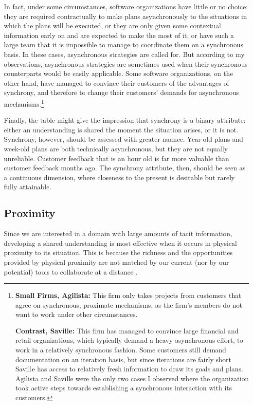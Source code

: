 In fact, under some circumstances, software organizations have little or no choice: they are required contractually to make plans asynchronously to the situations in which the plans will be executed, or they are only given some contextual information early on and are expected to make the most of it, or have such a large team that it is impossible to manage to coordinate them on a synchronous basis. In these cases, asynchronous strategies are called for. But according to my observations, asynchronous strategies are sometimes used when their synchronous counterparts would be easily applicable. Some software organizations, on the other hand, have managed to convince their customers of the advantages of synchrony, and therefore to change their customers' demands for asynchronous mechanisms.\footnote{\textbf{Small Firms, Agilista:} This firm only takes projects from customers that agree on synchronous, proximate mechanisms, as the firm's members do not want to work under other circumstances.
\par \textbf{Contrast, Saville:} This firm has managed to convince large financial and retail organizations, which typically demand a heavy asynchronous effort, to work in a relatively synchronous fashion. Some customers still demand documentation on an iteration basis, but since iterations are fairly short Saville has access to relatively fresh information to draw its goals and plans. Agilista and Saville were the only two cases I observed where the organization took active steps towards establishing a synchronous interaction with its customers.}

Finally, the table might give the impression that synchrony is a binary attribute: either an understanding is shared the moment the situation arises, or it is not. Synchrony, however, should be assessed with greater nuance. Year-old plans and week-old plans are both technically asynchronous, but they are not equally unreliable. Customer feedback that is an hour old is far more valuable than customer feedback months ago. The synchrony attribute, then, should be seen as a continuous dimension, where closeness to the present is desirable but rarely fully attainable.


\subsection{Proximity}

Since we are interested in a domain with large amounts of tacit information, developing a shared understanding is most effective when it occurs in physical proximity to its situation. This is because the richness and the opportunities provided by physical proximity are not matched by our current (nor by our potential) tools to collaborate at a distance \cite{Olson2000}.

